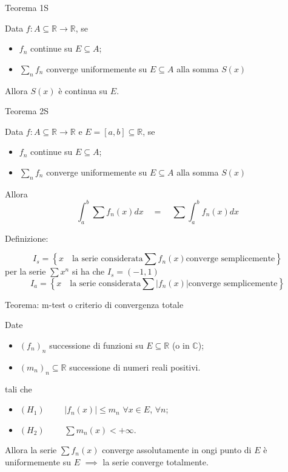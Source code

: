 \documentclass[x11names]{article}
\newcommand{\definizione}[2]{
	\begin{center}
		\fboxsep11pt
		\colorbox{myblue}{\begin{minipage}{5.75in}
				\begin{blues}{Definizione: #1}
					#2
				\end{blues}
		\end{minipage}}
	\end{center}
}
\newcommand{\teorema}[2]{
	\begin{center}
		\fboxsep11pt
		\colorbox{myred}{\begin{minipage}{5.75in}
				\begin{redes}{#1}
					#2
				\end{redes}
		\end{minipage}}
	\end{center}
}
\begin{document}
\teorema{Teorema 1S}{
Data \(f:A\subseteq \mathbb{R} \to \mathbb{R}\), se
\begin{itemize}
	\item \(f_{n}\) continue su \(E\subseteq A\);
	\item \(\sum_n f_{n}\) converge uniformemente su \(E\subseteq A\) alla somma \(S(x)\)
\end{itemize}
Allora \(S(x)\) è continua su \(E\).}
\teorema{Teorema 2S}{
Data \(f:A\subseteq \mathbb{R} \to \mathbb{R}\) e \(E = [a,b]\subseteq \mathbb{R}\), se
\begin{itemize}
\item \(f_{n}\) continue su \(E\subseteq A\);
\item \(\sum_n f_{n}\) converge uniformemente su \(E\subseteq A\) alla somma \(S(x)\)
\end{itemize}
Allora
\[ 
\int_{a}^{b} \sum f_{n}(x)dx \quad  = \quad \sum \int_{a}^{b}  f_{n}(x)dx 
\]}

\definizione{}{
	\[ 
	I_{s} = \left\{x \;\:\;\ \text{la serie considerata} \sum f_{n}(x) \text{converge semplicemente} \right\}
	\]
	per la serie \(\sum x^n\) si ha che \(I_{s} = (-1,1)\)
	\[ 
	I_{a} = \left\{x \;\:\;\ \text{la serie considerata} \sum |f_{n}(x)| \text{converge semplicemente} \right\}
	\]
}

\teorema{Teorema: m-test o criterio di convergenza totale}{
Date 
\begin{itemize}
	\item \((f_{n})_{n}\) successione di funzioni su \(E\subseteq \mathbb{R}\) (o in \(\mathbb{C}\));
	\item \((m_{n})_{n} \subseteq \mathbb{R}\) successione di numeri reali positivi. 
\end{itemize}
tali che
\begin{itemize}
	\item \((H_{1})\qquad\) \(|f_{n}(x)|\leq m_{n}\) \(\forall x \in E\), \(\forall n\);
	\item \((H_{2})\qquad\) \(\sum m_{n}(x) < + \infty\).
\end{itemize}
Allora la serie \(\sum f_{n}(x)\) converge assolutamente in ongi punto di \(E\) è uniformemente su \(E\) \(\implies\) la serie converge totalmente.
}




	
\end{document}
